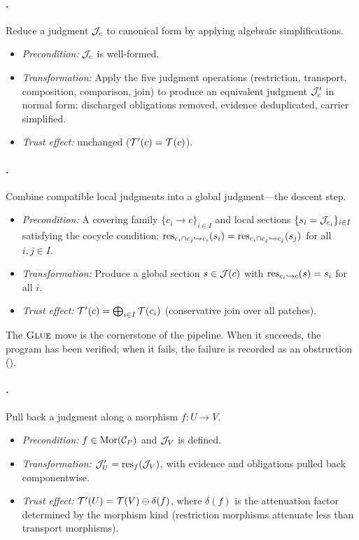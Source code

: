 \paragraph{\NORMALIZE.}
Reduce a judgment $\mathcal{J}_c$ to canonical form by applying algebraic
simplifications.
\begin{itemize}[nosep]
  \item \emph{Precondition:} $\mathcal{J}_c$ is well-formed.
  \item \emph{Transformation:}
        Apply the five judgment operations (restriction, transport,
        composition, comparison, join) to produce an equivalent judgment
        $\mathcal{J}'_c$ in normal form: discharged obligations removed,
        evidence deduplicated, carrier simplified.
  \item \emph{Trust effect:} unchanged ($\mathcal{T}'(c) = \mathcal{T}(c)$).
\end{itemize}

\paragraph{\GLUE.}
Combine compatible local judgments into a global judgment---the
descent step.
\begin{itemize}[nosep]
  \item \emph{Precondition:}
        A covering family $\{c_i \to c\}_{i \in I}$ and local
        sections $\{s_i = \mathcal{J}_{c_i}\}_{i \in I}$ satisfying the
        cocycle condition:
        $\mathrm{res}_{c_i \cap c_j \hookrightarrow c_i}(s_i) =
         \mathrm{res}_{c_i \cap c_j \hookrightarrow c_j}(s_j)$ for all
        $i,j \in I$.
  \item \emph{Transformation:}
        Produce a global section $s \in \mathcal{J}(c)$ with
        $\mathrm{res}_{c_i \hookrightarrow c}(s) = s_i$ for all $i$.
  \item \emph{Trust effect:}
        $\mathcal{T}'(c) = \bigoplus_{i \in I} \mathcal{T}(c_i)$
        (conservative join over all patches).
\end{itemize}
The $\textsc{Glue}$ move is the cornerstone of the pipeline.  When it
succeeds, the program has been verified; when it fails, the failure
is recorded as an obstruction (\cf \REPAIR).

\paragraph{\RESTRICT.}
Pull back a judgment along a morphism $f : U \to V$.
\begin{itemize}[nosep]
  \item \emph{Precondition:}
        $f \in \mathrm{Mor}(\mathcal{C}_P)$ and $\mathcal{J}_V$ is defined.
  \item \emph{Transformation:}
        $\mathcal{J}'_U = \mathrm{res}_f(\mathcal{J}_V)$, with evidence and obligations
        pulled back componentwise.
  \item \emph{Trust effect:}
        $\mathcal{T}'(U) = \mathcal{T}(V) \ominus \delta(f)$, where
        $\delta(f)$ is the attenuation factor determined by the
        morphism kind (restriction morphisms attenuate less than
        transport morphisms).
\end{itemize}

